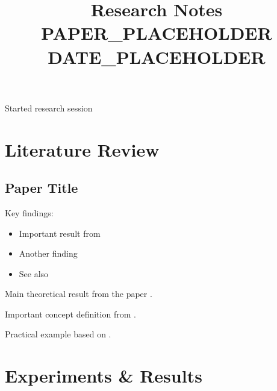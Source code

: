 \documentclass[a4paper,11pt]{article}
\title{
    \vspace{-2cm}
    \textcolor{noteblue}{\Huge Research Notes}\\
    \vspace{0.5cm}
    \textcolor{sidenotegray}{\Large PAPER_PLACEHOLDER}\\
    \vspace{0.2cm}
    \textcolor{sidenotegray}{\large DATE_PLACEHOLDER}
}
\author{}
\date{}
\begin{document}
\maketitle
\thispagestyle{empty}
\newpage

\begin{progress}
    \item Started research session
    \item 
\end{progress}

\begin{ideas}
    \item 
\end{ideas}

\begin{questions}
    \item 
\end{questions}

\section{Literature Review}

\subsection{Paper Title}

Key findings:
\begin{itemize}
    \item Important result from \cite{example2024}
    \item Another finding \citep{author2024}
    \item See also \citet{smith2024}
\end{itemize}

\begin{theorem}
Main theoretical result from the paper \citep{example2024}.
\end{theorem}

\begin{definition}
Important concept definition from \cite{author2024}.
\end{definition}

\begin{example}
Practical example based on \citet{smith2024}.
\end{example}

\section{Experiments \& Results}
\end{document}
